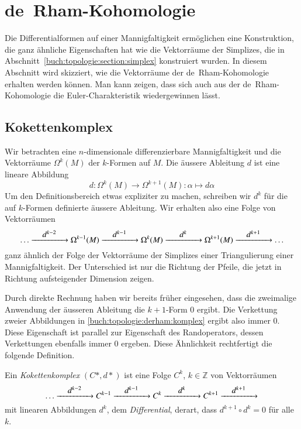 %
%
\section{de~Rham-Kohomologie
\label{buch:topologie:section:drham}}
Die Differentialformen auf einer Mannigfaltigkeit ermöglichen eine
Konstruktion, die ganz ähnliche Eigenschaften hat wie die Vektorräume
der Simplizes, die in Abschnitt~\ref{buch:topologie:section:simplex}
konstruiert wurden.
In diesem Abschnitt wird skizziert, wie die Vektorräume der
de~Rham-Kohomologie erhalten werden können.
Man kann zeigen, dass sich auch aus der de~Rham-Kohomologie die
Euler-Charakteristik wiedergewinnen lässt.

%
%
\subsection{Kokettenkomplex}
Wir betrachten eine $n$-dimensionale differenzierbare Mannigfaltigkeit
und die Vektorräume $\Omega^k(M)$ der $k$-Formen auf $M$.
Die äussere Ableitung $d$ ist eine lineare Abbildung
\[
d
\colon
\Omega^k(M) \to \Omega^{k+1}(M)
:
\alpha \mapsto d\alpha
\]
Um den Definitionsbereich etwas expliziter zu machen, schreiben wir
$d^k$ für die auf $k$-Formen definierte äussere Ableitung.
Wir erhalten also eine Folge von Vektorräumen 
\begin{equation}
\dots
\xrightarrow{\qquad\clap{$d^{k-2}$}\qquad}
\Omega^{k-1}(M)
\xrightarrow{\qquad\clap{$d^{k-1}$}\qquad}
\Omega^k(M)
\xrightarrow{\qquad\clap{$d^{k}$}\qquad}
\Omega^{k+1}(M)
\xrightarrow{\qquad\clap{$d^{k+1}$}\qquad}
\dots
\label{buch:topologie:derham:komplex}
\end{equation}
ganz ähnlich der Folge der Vektorräume der Simplizes einer
Triangulierung einer Mannigfaltigkeit.
Der Unterschied ist nur die Richtung der Pfeile, die jetzt in
Richtung aufsteigender Dimension zeigen.

Durch direkte Rechnung haben wir bereits früher eingesehen, dass die
zweimalige Anwendung der äusseren Ableitung die $k+1$-Form 0 ergibt.
Die Verkettung zweier Abbildungen in \eqref{buch:topologie:derham:komplex}
ergibt also immer $0$.
Diese Eigenschaft ist parallel zur Eigenschaft des Randoperators,
dessen Verkettungen ebenfalls immer $0$ ergeben.
Diese Ähnlichkeit rechtfertigt die folgende Definition.

\begin{definition}[Kokettenkomplex]
%
Ein \emph{Kokettenkomplex} $(C*,d*)$ ist eine Folge $C^k$, $k\in\mathbb{Z}$
von Vektorräumen 
\[
\dots
\xrightarrow{\qquad\clap{$d^{k-2}$}\qquad}
C^{k-1}
\xrightarrow{\qquad\clap{$d^{k-1}$}\qquad}
C^k
\xrightarrow{\qquad\clap{$d^{k}$}\qquad}
C^{k+1}
\xrightarrow{\qquad\clap{$d^{k+1}$}\qquad}
\]
mit linearen Abbildungen $d^k$, dem \emph{Differential},
%
derart, dass $d^{k+1}\circ d^k=0$ für alle $k$.
\end{definition}

